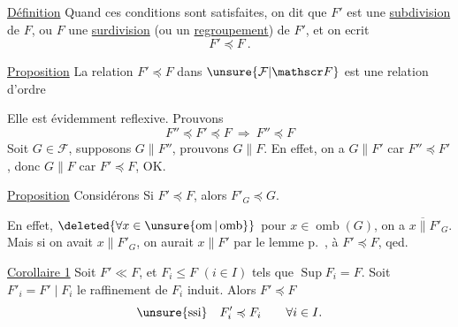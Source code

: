 \uline{Définition} \quad Quand ces conditions sont satisfaites, on dit que $F'$ est une \uline{subdivision} de $F$, ou $F$ une \uline{surdivision} (ou un \uline{regroupement}) de $F'$, et on ecrit
\[
F'\preccurlyeq F\ .
\]

\uline{Proposition} \quad La relation $F'\preccurlyeq F$ dans $\unsure{\mathcal F|\mathscr F}$ est une relation d'ordre

Elle est évidemment reflexive. Prouvons
\[
F''\preccurlyeq F'\preccurlyeq F\ \Longrightarrow\ F''\preccurlyeq F
\]
Soit $G\in\mathcal F$, supposons $G\parallel F''$, prouvons $G\parallel F$. En effet, on a $G\parallel F'$ car $F''\preccurlyeq F'$, donc $G\parallel F$ car $F'\preccurlyeq F$, OK.

\uline{Proposition} \quad Considérons
Si $F'\preccurlyeq F$, alors $F'_G\preccurlyeq G$.

En effet,   $\deleted{\forall x\in\unsure{\operatorname{om}|\operatorname{omb}}}$ pour $x\in\operatorname{omb}(G)$, on a $x\mathrel{\overline{\parallel}}F'_G$. Mais si on avait $x\parallel F'_G$, on aurait $x\parallel F'$ par le lemme p.~,  à $F'\preccurlyeq F$, qed.

\uline{Corollaire 1} \quad Soit $F'\ll F$, et $F_i\leqslant F$ $(i\in I)$ tels que $\operatorname{Sup} F_i=F$. Soit $F'_i=F'\mid F_i$ le raffinement de $F_i$ induit. Alors $F'\preccurlyeq F$
\[
\text{\unsure{ssi}}\quad F'_i\preccurlyeq F_i\qquad\forall i\in I.
\]
